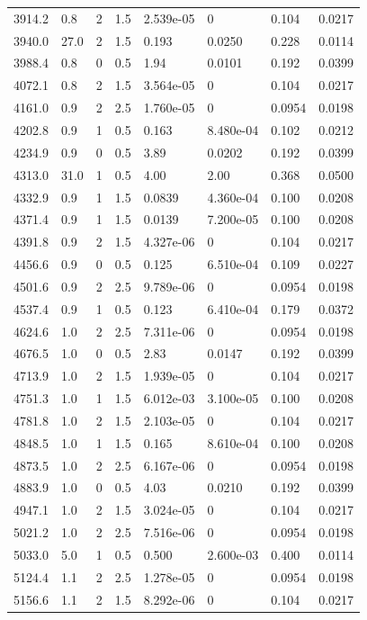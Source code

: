 \documentclass[preview]{standalone}
\begin{document}
{{\begin{tabular}{L{1.2cm}C{1.2cm} C{0.3cm}C{0.5cm} C{1.4cm}C{1.4cm} C{1.4cm}C{1.4cm}}
  3914.2  &   0.8  & 2     & 1.5 &  2.539e-05  & 0  & 0.104 &  0.0217   \\ 
  3940.0  &  27.0  & 2     & 1.5 &  0.193  & 0.0250  & 0.228 &  0.0114   \\ 
  3988.4  &   0.8  & 0     & 0.5 &  1.94  & 0.0101  & 0.192 &  0.0399   \\ 
  4072.1  &   0.8  & 2     & 1.5 &  3.564e-05  & 0  & 0.104 &  0.0217   \\ 
  4161.0  &   0.9  & 2     & 2.5 &  1.760e-05  & 0  & 0.0954 &  0.0198   \\ 
  4202.8  &   0.9  & 1     & 0.5 &  0.163  & 8.480e-04  & 0.102 &  0.0212   \\ 
  4234.9  &   0.9  & 0     & 0.5 &  3.89  & 0.0202  & 0.192 &  0.0399   \\ 
  4313.0  &  31.0  & 1     & 0.5 &  4.00  & 2.00  & 0.368 &  0.0500   \\ 
  4332.9  &   0.9  & 1     & 1.5 &  0.0839  & 4.360e-04  & 0.100 &  0.0208   \\ 
  4371.4  &   0.9  & 1     & 1.5 &  0.0139  & 7.200e-05  & 0.100 &  0.0208   \\ 
  4391.8  &   0.9  & 2     & 1.5 &  4.327e-06  & 0  & 0.104 &  0.0217   \\ 
  4456.6  &   0.9  & 0     & 0.5 &  0.125  & 6.510e-04  & 0.109 &  0.0227   \\ 
  4501.6  &   0.9  & 2     & 2.5 &  9.789e-06  & 0  & 0.0954 &  0.0198   \\ 
  4537.4  &   0.9  & 1     & 0.5 &  0.123  & 6.410e-04  & 0.179 &  0.0372   \\ 
  4624.6  &   1.0  & 2     & 2.5 &  7.311e-06  & 0  & 0.0954 &  0.0198   \\ 
  4676.5  &   1.0  & 0     & 0.5 &  2.83  & 0.0147  & 0.192 &  0.0399   \\ 
  4713.9  &   1.0  & 2     & 1.5 &  1.939e-05  & 0  & 0.104 &  0.0217   \\ 
  4751.3  &   1.0  & 1     & 1.5 &  6.012e-03  & 3.100e-05  & 0.100 &  0.0208   \\ 
  4781.8  &   1.0  & 2     & 1.5 &  2.103e-05  & 0  & 0.104 &  0.0217   \\ 
  4848.5  &   1.0  & 1     & 1.5 &  0.165  & 8.610e-04  & 0.100 &  0.0208   \\ 
  4873.5  &   1.0  & 2     & 2.5 &  6.167e-06  & 0  & 0.0954 &  0.0198   \\ 
  4883.9  &   1.0  & 0     & 0.5 &  4.03  & 0.0210  & 0.192 &  0.0399   \\ 
  4947.1  &   1.0  & 2     & 1.5 &  3.024e-05  & 0  & 0.104 &  0.0217   \\ 
  5021.2  &   1.0  & 2     & 2.5 &  7.516e-06  & 0  & 0.0954 &  0.0198   \\ 
  5033.0  &   5.0  & 1     & 0.5 &  0.500  & 2.600e-03  & 0.400 &  0.0114   \\ 
  5124.4  &   1.1  & 2     & 2.5 &  1.278e-05  & 0  & 0.0954 &  0.0198   \\ 
  5156.6  &   1.1  & 2     & 1.5 &  8.292e-06  & 0  & 0.104 &  0.0217   \\ 
\hline 
\end{tabular} 

}}
\end{document}
